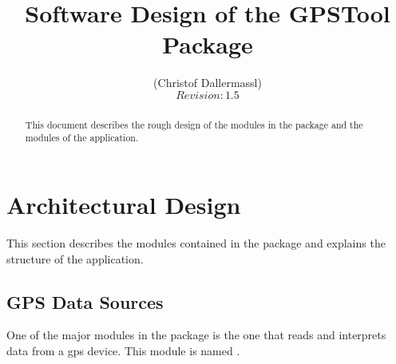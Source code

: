 \documentclass[a4paper]{article} %
\begin{document}
\begin{Form}\end{Form}

\title{Software Design of the GPSTool Package}                     %
\author{(Christof Dallermassl)\\                         %
  $Revision: 1.5 $}                      %


\maketitle

\vspace{1cm}

\begin{abstract}

This document describes the rough design of the modules in the
 package and the modules of the
 application.

\end{abstract}

\newpage

\tableofcontents

\newpage

\section{Architectural Design}
\label{SoftwareDesignOfTheGpstoolPackage-ArchitecturalDesign}

This section describes the modules contained in the
 package and explains the structure
of the  application.

\subsection{GPS Data Sources}
\label{SoftwareDesignOfTheGpstoolPackage-GpsDataSources}

One of the major modules in the 
package is the one that reads and interprets data from a gps
device. This module is named
.
\end{document}
